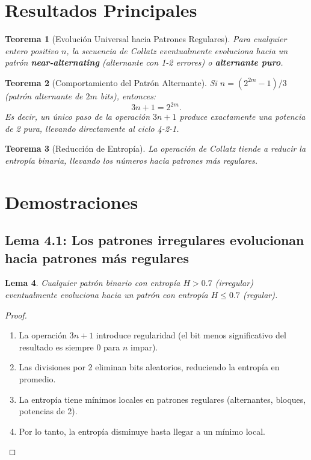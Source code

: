 \documentclass[11pt,a4paper]{article}
\newtheorem{theorem}{Teorema}[section]
\newtheorem{lemma}[theorem]{Lema}
\begin{document}
\section{Resultados Principales}

\begin{theorem}[Evolución Universal hacia Patrones Regulares]
\label{thm:evolucion}
Para cualquier entero positivo \( n \), la secuencia de Collatz eventualmente evoluciona hacia un patrón \textbf{near-alternating} (alternante con 1-2 errores) o \textbf{alternante puro}.
\end{theorem}

\begin{theorem}[Comportamiento del Patrón Alternante]
\label{thm:alternante}
Si \( n = (2^{2m} - 1)/3 \) (patrón alternante de \( 2m \) bits), entonces:
\[
3n + 1 = 2^{2m}.
\]
Es decir, un único paso de la operación \( 3n + 1 \) produce exactamente una potencia de 2 pura, llevando directamente al ciclo 4-2-1.
\end{theorem}

\begin{theorem}[Reducción de Entropía]
\label{thm:entropia}
La operación de Collatz tiende a reducir la entropía binaria, llevando los números hacia patrones más regulares.
\end{theorem}

\section{Demostraciones}

\subsection{Lema 4.1: Los patrones irregulares evolucionan hacia patrones más regulares}

\begin{lemma}
Cualquier patrón binario con entropía \( H > 0.7 \) (irregular) eventualmente evoluciona hacia un patrón con entropía \( H \leq 0.7 \) (regular).
\end{lemma}

\begin{proof}
\begin{enumerate}
    \item La operación \( 3n + 1 \) introduce regularidad (el bit menos significativo del resultado es siempre 0 para \( n \) impar).
    \item Las divisiones por 2 eliminan bits aleatorios, reduciendo la entropía en promedio.
    \item La entropía tiene mínimos locales en patrones regulares (alternantes, bloques, potencias de 2).
    \item Por lo tanto, la entropía disminuye hasta llegar a un mínimo local.
\end{enumerate}
\end{proof}
\end{document}
